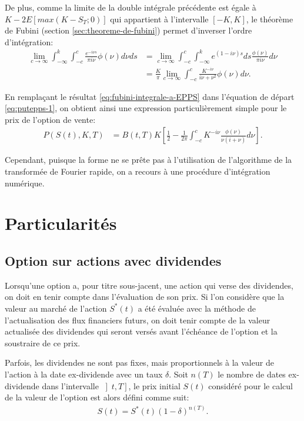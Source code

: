 De plus, comme la limite de la double intégrale précédente est égale à
$K-2E\left[max(K-S_T;0) \right]$ qui appartient à l'intervalle
$\left[-K,K\right]$, le théorème de Fubini (section
\ref{sec:theoreme-de-fubini}) permet d'inverser l'ordre d'intégration:
\begin{align}
  \lim_{c\to\infty} \int_{-\infty}^{k}\int_{-c}^{c} \frac{e^{-i\nu
      s}}{\pi i\nu}\phi(\nu)d\nu ds &= \lim_{c\to\infty} \int_{-c}^{c} \int_{-\infty}^{k}e^{(1-i\nu)s} ds \frac{\phi(\nu)}{\pi i \nu} d\nu \nonumber\\
  &= \frac{K}{\pi} \lim_{c\to\infty} \int_{-c}^{c}
  \frac{K^{-i\nu}}{i\nu+\nu^2}\phi(\nu)d\nu. \label{eq:fubini-integrale-a-EPPS}
\end{align}

En remplaçant le résultat \eqref{eq:fubini-integrale-a-EPPS} dans
l'équation de départ \eqref{eq:putepps-1}, on obtient ainsi une
expression particulièrement simple pour le prix de l'option de vente:
\begin{align}
  P(S(t),K,T) &= B(t,T)K\left[\frac{1}{2}-\frac{1}{2\pi} \int_{-c}^c
    K^{-i\nu} \frac{\phi(\nu)}{\nu(i+\nu)}
    d\nu\right]. \label{eq:PutEpps8.37}
\end{align}

Cependant, puisque la forme ne se prête pas à l'utilisation de
l'algorithme de la transformée de Fourier rapide, on a recours à une
procédure d'intégration numérique.

\section{Particularités}
\label{sec:monnaiescontrats}

\subsection{Option sur actions avec dividendes}
\label{sec:dividentoptions}

Lorsqu'une option a, pour titre sous-jacent, une action qui verse des
dividendes, on doit en tenir compte dans l'évaluation de son prix. Si
l'on considère que la valeur au marché de l'action $S^{*}(t)$ a été
évaluée avec la méthode de l'actualisation des flux financiers futurs,
on doit tenir compte de la valeur actualisée des dividendes qui seront
versés avant l'échéance de l'option et la soustraire de ce prix.

Parfois, les dividendes ne sont pas fixes, mais proportionnels à la
valeur de l'action à la date ex-dividende avec un taux $\delta$. Soit
$n(T)$ le nombre de dates ex-dividende dans l'intervalle $\left] t,T
\right]$, le prix initial $S(t)$ considéré pour le calcul de la valeur
de l'option est alors défini comme suit:
\begin{align}
  \label{eq:prixinitialdividende}
  S(t) = S^{*}(t) (1-\delta)^{n(T)}.
\end{align}

